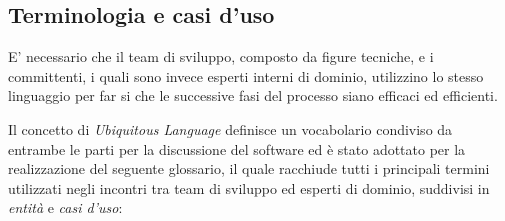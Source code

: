 \subsection{Terminologia e casi d'uso}
E' necessario che il team di sviluppo, composto da figure tecniche, e i committenti, i quali sono invece esperti interni di dominio, utilizzino lo stesso linguaggio per far si che le successive fasi del processo siano efficaci ed efficienti. 

Il concetto di \textit{Ubiquitous Language} definisce un vocabolario condiviso da entrambe le parti per la discussione del software\cite{evans_domain-driven_2004} ed è stato adottato per la realizzazione del seguente glossario, il quale racchiude tutti i principali termini utilizzati negli incontri tra team di sviluppo ed esperti di dominio, suddivisi in \textit{entità} e \textit{casi d'uso}:

